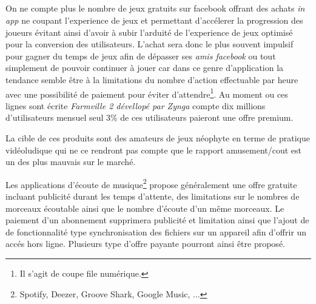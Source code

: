 \documentclass[11pt, a4paper ]{article}
\begin{document}
\begin{spacing}{1.5}
\subparagraph{} %

On ne compte plus le nombre de jeux gratuits sur facebook offrant des achats \emph{in app} ne coupant l'experience de jeux et permettant d'accélerer la progression des joueurs évitant ainsi d'avoir à subir l'arduité de l'experience de jeux optimisé pour la conversion des utilisateurs. L'achat sera donc le plus souvent impulsif pour gagner du temps de jeux afin de dépasser ses \emph{amis facebook} ou tout simplement de pouvoir continuer à jouer car dans ce genre d'application la tendance semble être à la limitations du nombre d'action effectuable par heure avec une possibilité de paiement pour éviter d'attendre\footnote{Il s'agit de coupe file numérique.}. Au moment ou ces lignes sont écrite \emph{Farmville 2 dévellopé par Zynga} compte dix millions d'utilisateurs mensuel seul 3\% de ces utilisateurs paieront une offre premium.


La cible de ces produits sont des amateurs de jeux néophyte en terme de pratique vidéoludique qui ne ce rendront pas compte que le rapport amusement/cout est un des plus mauvais sur le marché.

\subsubparagraph{}
Les applications d'écoute de musique\footnote{Spotify, Deezer, Groove Shark, Google Music, ...} propose généralement une offre gratuite incluant publicité durant les temps d'attente, des limitations sur le nombres de morceaux écoutable ainsi que le nombre d'écoute d'un même morceaux.
Le paiement d'un abonnement supprimera publicité et limitation ainsi que l'ajout de de fonctionnalité type synchronisation des fichiers sur un appareil afin d'offrir un accés hors ligne. Plusieurs type d'offre payante pourront ainsi être proposé.



\end{spacing}
\end{document}

